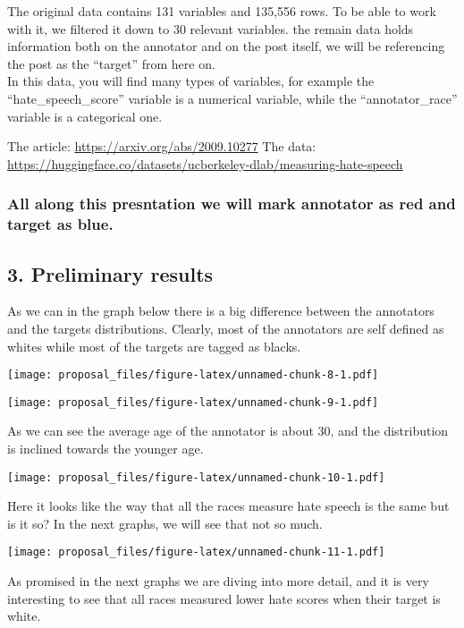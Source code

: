 \documentclass[
]{article}
\begin{document}
The original data contains 131 variables and 135,556 rows. To be able to
work with it, we filtered it down to 30 relevant variables. the remain
data holds information both on the annotator and on the post itself, we
will be referencing the post as the ``target'' from here on.\\
In this data, you will find many types of variables, for example the
``hate\_speech\_score'' variable is a numerical variable, while the
``annotator\_race'' variable is a categorical one.

The article: \url{https://arxiv.org/abs/2009.10277} The data:
\url{https://huggingface.co/datasets/ucberkeley-dlab/measuring-hate-speech}

\hypertarget{all-along-this-presntation-we-will-mark-annotator-as-red-and-target-as-blue.}{%
\subsubsection{All along this presntation we will mark annotator as red
and target as
blue.}\label{all-along-this-presntation-we-will-mark-annotator-as-red-and-target-as-blue.}}

\hypertarget{preliminary-results}{%
\subsection{3. Preliminary results}\label{preliminary-results}}

As we can in the graph below there is a big difference between the
annotators and the targets distributions. Clearly, most of the
annotators are self defined as whites while most of the targets are
tagged as blacks.

\texttt{[image: proposal\_files/figure-latex/unnamed-chunk-8-1.pdf]}

\texttt{[image: proposal\_files/figure-latex/unnamed-chunk-9-1.pdf]}

As we can see the average age of the annotator is about 30, and the
distribution is inclined towards the younger age.

\texttt{[image: proposal\_files/figure-latex/unnamed-chunk-10-1.pdf]}

Here it looks like the way that all the races measure hate speech is the
same but is it so? In the next graphs, we will see that not so much.

\texttt{[image: proposal\_files/figure-latex/unnamed-chunk-11-1.pdf]}

As promised in the next graphs we are diving into more detail, and it is
very interesting to see that all races measured lower hate scores when
their target is white.
\end{document}
